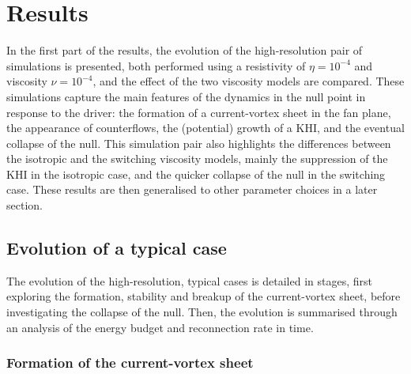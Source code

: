 \section{Results}

\label{sec:khi_results}

In the first part of the results, the evolution of the high-resolution pair of simulations is presented, both performed using a resistivity of $\eta = 10^{-4}$ and viscosity $\nu = 10^{-4}$, and the effect of the two viscosity models are compared. These simulations capture the main features of the dynamics in the null point in response to the driver: the formation of a current-vortex sheet in the fan plane, the appearance of counterflows, the (potential) growth of a KHI, and the eventual collapse of the null. This simulation pair also highlights the differences between the isotropic and the switching viscosity models, mainly the suppression of the KHI in the isotropic case, and the quicker collapse of the null in the switching case. These results are then generalised to other parameter choices in a later section.

\subsection{Evolution of a typical case}
\label{sec:null_point_khi_single_case}

The evolution of the high-resolution, typical cases is detailed in stages, first exploring the formation, stability and breakup of the current-vortex sheet, before investigating the collapse of the null. Then, the evolution is summarised through an analysis of the energy budget and reconnection rate in time.

\subsubsection{Formation of the current-vortex sheet}

